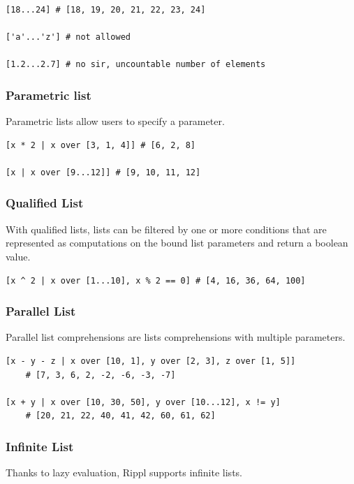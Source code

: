 \documentclass[5pt]{article}
\begin{document}
\begin{lstlisting}[language=rippl]
[18...24] # [18, 19, 20, 21, 22, 23, 24]

['a'...'z'] # not allowed

[1.2...2.7] # no sir, uncountable number of elements
\end{lstlisting}

\subsubsection{Parametric list}
Parametric lists allow users to specify a parameter.

\begin{lstlisting}[language=rippl]
[x * 2 | x over [3, 1, 4]] # [6, 2, 8] 

[x | x over [9...12]] # [9, 10, 11, 12]
\end{lstlisting}


\subsubsection{Qualified List}
With qualified lists, lists can be filtered by one or more conditions that are represented as computations on the bound list parameters and return a boolean value.

\begin{lstlisting}[language=rippl]
[x ^ 2 | x over [1...10], x % 2 == 0] # [4, 16, 36, 64, 100]
\end{lstlisting}


\subsubsection{Parallel List}
Parallel list comprehensions are lists comprehensions with multiple parameters.

\begin{lstlisting}[language=rippl]
[x - y - z | x over [10, 1], y over [2, 3], z over [1, 5]] 
    # [7, 3, 6, 2, -2, -6, -3, -7]
    
[x + y | x over [10, 30, 50], y over [10...12], x != y]
    # [20, 21, 22, 40, 41, 42, 60, 61, 62]
\end{lstlisting}

\subsubsection{Infinite List}
Thanks to lazy evaluation, Rippl supports infinite lists. 
\end{document}

